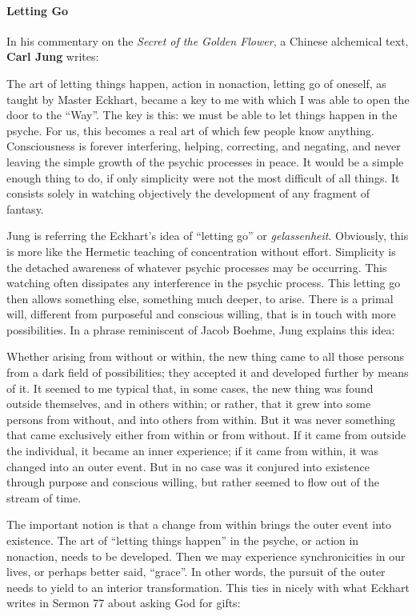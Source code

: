 \paragraph{Letting Go}
In his commentary on the \emph{Secret of the Golden Flower}, a Chinese alchemical text, \textbf{Carl Jung} writes:

\begin{quotex}
The art of letting things happen, action in nonaction, letting go of oneself, as taught by Master Eckhart, became a key to me with which I was able to open the door to the “Way”. The key is this: we must be able to let things happen in the psyche. For us, this becomes a real art of which few people know anything. Consciousness is forever interfering, helping, correcting, and negating, and never leaving the simple growth of the psychic processes in peace. It would be a simple enough thing to do, if only simplicity were not the most difficult of all things. It consists solely in watching objectively the development of any fragment of fantasy. 

\end{quotex}
Jung is referring the Eckhart's idea of “letting go” or \emph{gelassenheit}. Obviously, this is more like the Hermetic teaching of concentration without effort. Simplicity is the detached awareness of whatever psychic processes may be occurring. This watching often dissipates any interference in the psychic process. This letting go then allows something else, something much deeper, to arise. There is a primal will, different from purposeful and conscious willing, that is in touch with more possibilities. In a phrase reminiscent of Jacob Boehme, Jung explains this idea:

\begin{quotex}
Whether arising from without or within, the new thing came to all those persons from a dark field of possibilities; they accepted it and developed further by means of it. It seemed to me typical that, in some cases, the new thing was found outside themselves, and in others within; or rather, that it grew into some persons from without, and into others from within. But it was never something that came exclusively either from within or from without. If it came from outside the individual, it became an inner experience; if it came from within, it was changed into an outer event. But in no case was it conjured into existence through purpose and conscious willing, but rather seemed to flow out of the stream of time. 

\end{quotex}
The important notion is that a change from within brings the outer event into existence. The art of “letting things happen” in the psyche, or action in nonaction, needs to be developed. Then we may experience synchronicities in our lives, or perhaps better said, “grace”. In other words, the pursuit of the outer needs to yield to an interior transformation. This ties in nicely with what Eckhart writes in Sermon 77 about asking God for gifts:

